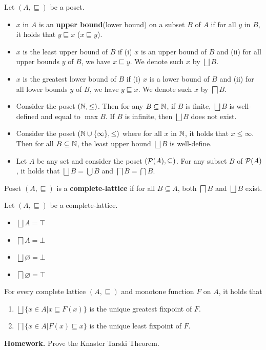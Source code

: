 \begin{definition}
    Let $(A,\sqsubseteq)$ be a poset.
    \begin{itemize}
        \item $x$ in $A$ is an \textbf{upper bound}(lower bound) on a subset $B$ of $A$ if for all $y$ in $B$, it holds that $y \sqsubseteq x$ ($x \sqsubseteq y$).
        \item $x$ is the least upper bound of $B$ if (i) $x$ is an upper bound of $B$ and (ii) for all upper bounds $y$ of $B$, we have $x \sqsubseteq y$. We denote such $x$ by $\bigsqcup B$.
        \item $x$ is the greatest lower bound of $B$ if (i) $x$ is a lower bound of $B$ and (ii) for all lower bounds $y$ of $B$, we have $y \sqsubseteq x$. We denote such $x$ by $\bigsqcap B$.
    \end{itemize}
\end{definition}
\begin{example} 
    \begin{itemize}
        \item Consider the poset $(\N,\leq)$. Then for any $B \subseteq \N$, if $B$ is finite, $\bigsqcup B$ is well-defined and equal to $\max B$. If $B$ is infinite, then $\bigsqcup B$ does not exist. 
        \item Consider the poset $(\N \cup \{\infty\},\leq)$ where for all $x$ in $\N$, it holds that $x \leq \infty$. Then for all $B \subseteq \N$, the least upper bound $\bigsqcup B$ is well-define. 
        \item Let $A$ be any set and consider the poset $(\P(A),\subseteq)$. For any subset $B$ of $\P(A)$, it holds that $\bigsqcup B = \bigcup B$ and $\bigsqcap B = \bigcap B$. 
    \end{itemize}
\end{example}
\begin{definition}
    Poset $(A,\sqsubseteq)$ is a \textbf{complete-lattice} if for all $B \subseteq A$, both $\bigsqcap B$ and $\bigsqcup B$ exist.
\end{definition}
\begin{example}
    Let $(A,\sqsubseteq)$ be a complete-lattice. 
    \begin{itemize}
        \item $\bigsqcup A = \top$
        \item $\bigsqcap A = \bot$
        \item $\bigsqcup \varnothing = \bot$
        \item $\bigsqcap \varnothing = \top$
    \end{itemize}
\end{example}
\begin{theorem}
    For every complete lattice $(A,\sqsubseteq)$ and monotone function $F$ on $A$, it holds that
    \begin{enumerate}
        \item $\bigsqcup \{x\in A| x \sqsubseteq F(x)\}$ is the unique greatest fixpoint of $F$. 
        \item $\bigsqcap \{x \in A| F(x) \sqsubseteq x\}$ is the unique least fixpoint of $F$. 
    \end{enumerate}
\end{theorem}

\textbf{Homework.} Prove the Knaster Tarski Theorem. 